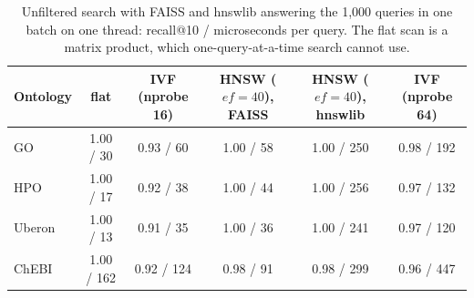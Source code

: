 \begin{table}[t]
\caption{Unfiltered search with FAISS and hnswlib answering the 1,000 queries in one batch on one thread: recall@10 / microseconds per query. The flat scan is a matrix product, which one-query-at-a-time search cannot use.}
\label{tab-index-batched}
\small
\begin{tabular}{@{}lccccc@{}}
\toprule
Ontology & flat & IVF (nprobe 16) & HNSW ($\mathit{ef}{=}40$), FAISS & HNSW ($\mathit{ef}{=}40$), hnswlib & IVF (nprobe 64) \\
\midrule
GO & 1.00 / 30 & 0.93 / 60 & 1.00 / 58 & 1.00 / 250 & 0.98 / 192 \\
HPO & 1.00 / 17 & 0.92 / 38 & 1.00 / 44 & 1.00 / 256 & 0.97 / 132 \\
Uberon & 1.00 / 13 & 0.91 / 35 & 1.00 / 36 & 1.00 / 241 & 0.97 / 120 \\
ChEBI & 1.00 / 162 & 0.92 / 124 & 0.98 / 91 & 0.98 / 299 & 0.96 / 447 \\
\bottomrule
\end{tabular}
\end{table}
